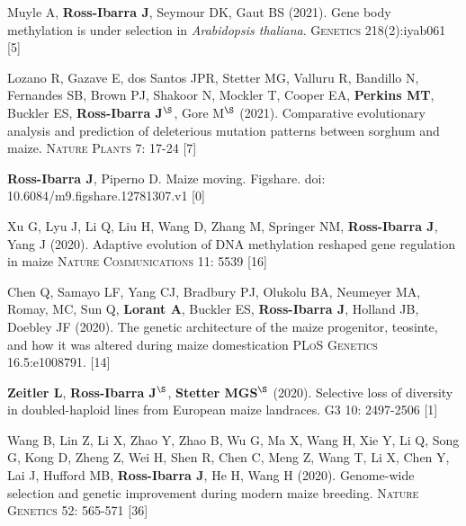 \documentclass[letterpaper,10pt]{article}
\begin{document}
\begin{etaremune}
\item Muyle A, \textbf{Ross-Ibarra J}, Seymour DK, Gaut BS (2021). Gene body methylation is under selection in \textit{Arabidopsis thaliana}. \textsc{Genetics} 218(2):iyab061 %
 [5]\\

\item Lozano R, Gazave E, dos Santos JPR, Stetter MG, Valluru R, Bandillo N, Fernandes SB, Brown PJ, Shakoor N, Mockler T, Cooper EA, \textbf{Perkins MT}, Buckler ES, \textbf{Ross-Ibarra J}$^\S$, Gore M$^\S$ (2021). Comparative evolutionary analysis and prediction of deleterious mutation patterns between sorghum and maize. \textsc{Nature Plants} 7: 17-24  %
 [7]\\

\item \textbf{Ross-Ibarra J}, Piperno D. Maize moving. Figshare. doi: 10.6084/m9.figshare.12781307.v1
 [0]\\

\item Xu G, Lyu J, Li Q, Liu H, Wang D, Zhang M, Springer NM, \textbf{Ross-Ibarra J}, Yang J (2020). Adaptive evolution of DNA methylation reshaped gene regulation in maize \textsc{Nature Communications} 11: 5539
 [16]\\

\item Chen Q, Samayo LF, Yang CJ, Bradbury PJ, Olukolu BA, Neumeyer MA, Romay, MC, Sun Q, \textbf{Lorant A}, Buckler ES, \textbf{Ross-Ibarra J}, Holland JB, Doebley JF (2020).
The genetic architecture of the maize progenitor, teosinte, and how it was altered during maize domestication \textsc{PLoS Genetics} 16.5:e1008791.
 [14]\\

\item \textbf{Zeitler L}, \textbf{Ross-Ibarra J}$^\S$, \textbf{Stetter MGS}$^\S$ (2020). Selective loss of diversity in doubled-haploid lines from European maize landraces. \textsc{G3} 10: 2497-2506
 [1]\\

\item Wang B, Lin Z, Li X, Zhao Y, Zhao B, Wu G, Ma X, Wang H, Xie Y, Li Q, Song G, Kong D, Zheng Z, Wei H, Shen R, Chen C, Meng Z, Wang T, Li X, Chen Y, Lai J, Hufford MB, \textbf{Ross-Ibarra J}, He H, Wang H (2020). Genome-wide selection and genetic improvement during modern maize breeding. \textsc{Nature Genetics} 52: 565-571
 [36]\\


\end{etaremune}
\end{document}
